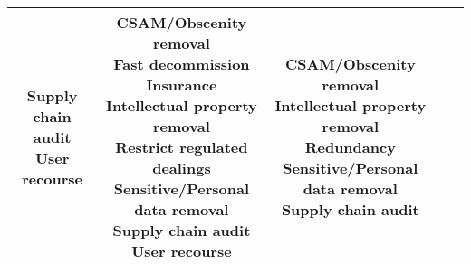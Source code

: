 \documentclass[fleqn]{article}
\begin{document}
\begin{landscape}
\begin{table}[H]
\begin{tabular}{|c|c|c|c|c|}
{			\textbullet\hspace{3pt} Supply chain audit \\ 	
			\textbullet\hspace{3pt} User recourse \\						 	 
		} 
		& \makecell[l]{
			\textbullet\hspace{3pt} CSAM/Obscenity removal \\ 	
			\textbullet\hspace{3pt} Fast decommission \\ 	
			\textbullet\hspace{3pt} Insurance \\ 	
			\textbullet\hspace{3pt} Intellectual property removal \\ 	
			\textbullet\hspace{3pt} Restrict regulated dealings \\ 	
			\textbullet\hspace{3pt} Sensitive/Personal data removal \\ 	
			\textbullet\hspace{3pt} Supply chain audit \\ 	
			\textbullet\hspace{3pt} User recourse \\  
		}
		& \makecell[l]{
			\textbullet\hspace{3pt} CSAM/Obscenity removal \\ 		
			\textbullet\hspace{3pt} Intellectual property removal \\ 	
			\textbullet\hspace{3pt} Redundancy \\ 		
			\textbullet\hspace{3pt} Sensitive/Personal data removal \\ 	
			\textbullet\hspace{3pt} Supply chain audit \\ 							 	 
		} 
		\\
		\hline
	\end{tabular}
	\label{table:high_risk_plan_by_gai_risk_cont2}
\end{table}

\vfill
\raisebox{-10pt}{\makebox[\linewidth]{\thepage}}

\end{landscape}
\end{document}
